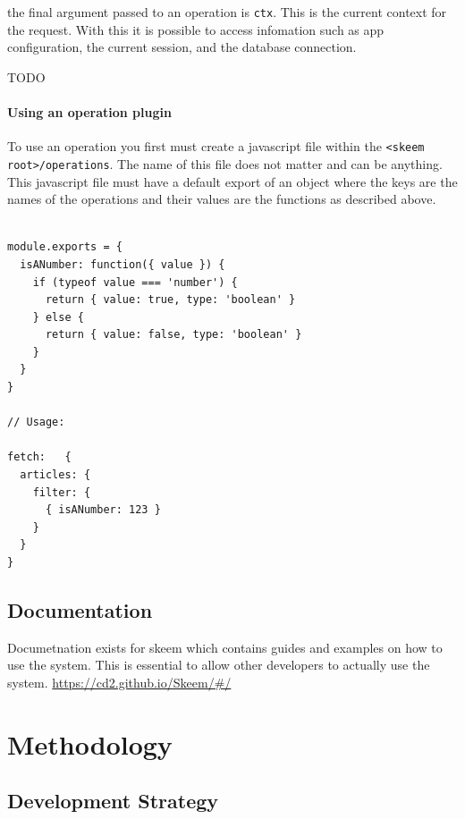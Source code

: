 \documentclass[
  12pt,
]{article}
\newcommand{\passthrough}[1]{#1}
\let\oldparagraph\paragraph
\renewcommand{\paragraph}[1]{\oldparagraph{#1}\mbox{}}
\begin{document}
the final argument passed to an operation is
\passthrough{\lstinline!ctx!}. This is the current context for the
request. With this it is possible to access infomation such as app
configuration, the current session, and the database connection.

TODO

\hypertarget{using-an-operation-plugin}{%
\paragraph{Using an operation plugin}\label{using-an-operation-plugin}}

To use an operation you first must create a javascript file within the
\passthrough{\lstinline!<skeem root>/operations!}. The name of this file
does not matter and can be anything. This javascript file must have a
default export of an object where the keys are the names of the
operations and their values are the functions as described above.

\begin{lstlisting}[caption={A full operation plugin file}]

module.exports = {
  isANumber: function({ value }) {
    if (typeof value === 'number') {
      return { value: true, type: 'boolean' }
    } else {
      return { value: false, type: 'boolean' }
    }
  }
}

// Usage:

fetch:   {
  articles: {
    filter: {
      { isANumber: 123 }
    }
  }
}
\end{lstlisting}

\hypertarget{documentation}{%
\subsection{Documentation}\label{documentation}}

Documetnation exists for skeem which contains guides and examples on how
to use the system. This is essential to allow other developers to
actually use the system. \url{https://cd2.github.io/Skeem/\#/}

\hypertarget{methodology}{%
\section{Methodology}\label{methodology}}

\hypertarget{development-strategy}{%
\subsection{Development Strategy}\label{development-strategy}}
\end{document}
